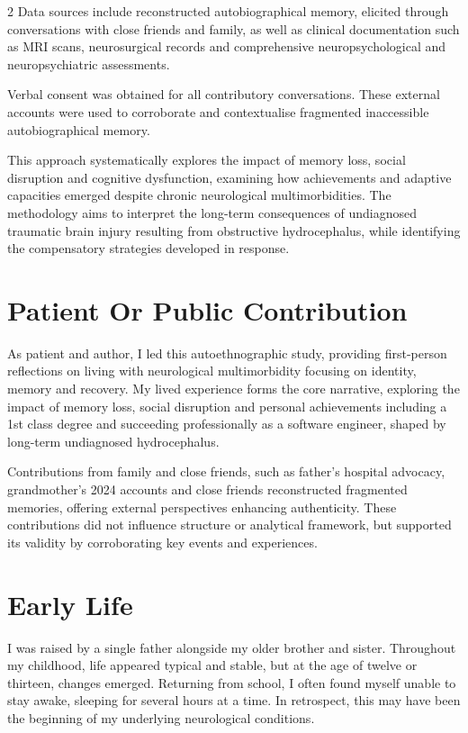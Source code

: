 \documentclass{article}
\begin{document}
\begin{multicols}{2}
Data sources include reconstructed autobiographical memory, elicited through conversations with close friends and family, as well as clinical documentation such as MRI scans, neurosurgical records and comprehensive neuropsychological and neuropsychiatric assessments.

Verbal consent was obtained for all contributory conversations. These external accounts were used to corroborate and contextualise fragmented inaccessible autobiographical memory.

This approach systematically explores the impact of memory loss, social disruption and cognitive dysfunction, examining how achievements and adaptive capacities emerged despite chronic neurological multimorbidities. The methodology aims to interpret the long-term consequences of undiagnosed traumatic brain injury resulting from obstructive hydrocephalus, while identifying the compensatory strategies developed in response.

\section*{Patient Or Public Contribution}
As patient and author, I led this autoethnographic study, providing first-person reflections on living with neurological multimorbidity focusing on identity, memory and recovery. My lived experience forms the core narrative, exploring the impact of memory loss, social disruption and personal achievements including a 1st class degree and succeeding professionally as a software engineer, shaped by long-term undiagnosed hydrocephalus.

Contributions from family and close friends, such as father’s hospital advocacy, grandmother's 2024 accounts and close friends reconstructed fragmented memories, offering external perspectives enhancing authenticity. These contributions did not influence structure or analytical framework, but supported its validity by corroborating key events and experiences.

\section*{Early Life}
I was raised by a single father alongside my older brother and sister. Throughout my childhood, life appeared typical and stable, but at the age of twelve or thirteen, changes emerged. Returning from school, I often found myself unable to stay awake, sleeping for several hours at a time. In retrospect, this may have been the beginning of my underlying neurological conditions.


\end{multicols}
\end{document}

